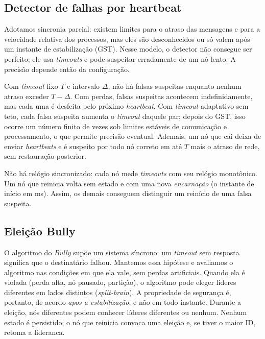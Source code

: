 \documentclass[conference]{IEEEtran}
\begin{document}
\subsection{Detector de falhas por heartbeat}
\label{sec:modelo-hb}

Adotamos sincronia parcial: existem limites para o atraso das mensagens e para a velocidade relativa dos processos, mas eles são desconhecidos ou só valem após um instante de estabilização (GST). Nesse modelo, o detector não consegue ser perfeito; ele usa \textit{timeouts} e pode suspeitar erradamente de um nó lento. A precisão depende então da configuração. 

Com \textit{timeout} fixo $T$ e intervalo $\Delta$, não há falsas suspeitas enquanto nenhum atraso exceder $T-\Delta$. Com perdas, falsas suspeitas acontecem indefinidamente, mas cada uma é desfeita pelo próximo \textit{heartbeat}. Com \textit{timeout} adaptativo sem teto, cada falsa suspeita aumenta o \textit{timeout} daquele par; depois do GST, isso ocorre um número finito de vezes sob limites estáveis de comunicação e processamento, o que permite precisão eventual. Ademais, um nó que cai deixa de enviar \textit{heartbeats} e é suspeito por todo nó correto em até $T$ mais o atraso de rede, sem restauração posterior.

Não há relógio sincronizado: cada nó mede \textit{timeouts} com seu relógio monotônico. Um nó que reinicia volta sem estado e com uma nova \textit{encarnação} (o instante de início em ms). Assim, os demais conseguem distinguir um reinício de uma falsa suspeita.

\subsection{Eleição Bully}
\label{sec:modelo-bully}

O algoritmo do \textit{Bully} supõe um sistema síncrono: um \textit{timeout} sem resposta significa que o destinatário falhou. Mantemos essa hipótese e avaliamos o algoritmo nas condições em que ela vale, sem perdas artificiais. Quando ela é violada (perda alta, nó pausado, partição), o algoritmo pode eleger líderes diferentes em lados distintos (\textit{split-brain}). A propriedade de segurança é, portanto, de acordo \emph{apos a estabilização}, e não em todo instante. Durante a eleição, nós diferentes podem conhecer líderes diferentes ou nenhum. Nenhum estado é persistido; o nó que reinicia convoca uma eleição e, se tiver o maior ID, retoma a lideranca.
\end{document}

